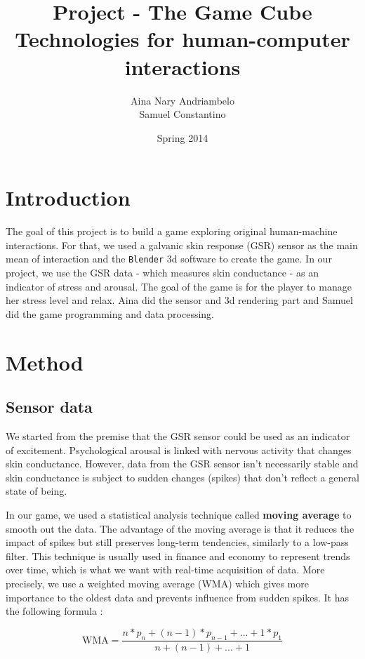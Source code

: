 \documentclass[12pt,a4paper]{article}
\title{\LARGE \textbf{Project - The Game Cube}\\
	\bigskip
	\bigskip
	\large Technologies for human-computer interactions}
\author{Aina Nary Andriambelo \\ Samuel Constantino}
\date{Spring 2014}
\begin{document}
	\maketitle


\section{Introduction}

The goal of this project is to build a game exploring original human-machine interactions. For that, we used a galvanic skin response (GSR) sensor as the main mean of interaction and the \texttt{Blender} 3d software to create the game. In our project, we use the GSR data - which measures skin conductance - as an indicator of stress and arousal. The goal of the game is for the player to manage her stress level and relax. Aina did the sensor and 3d rendering part and Samuel did the game programming and data processing.

\section{Method}

\subsection{Sensor data}

We started from the premise that the GSR sensor could be used as an indicator of excitement. Psychological arousal is linked with nervous activity that changes skin conductance. However, data from the GSR sensor isn't necessarily stable and skin conductance is subject to sudden changes (spikes) that don't reflect a general state of being.

In our game, we used a statistical analysis technique called \textbf{moving average} to smooth out the data. The advantage of the moving average is that it reduces the impact of spikes but still preserves long-term tendencies, similarly to a low-pass filter. This technique is usually used in finance and economy to represent trends over time, which is what we want with real-time acquisition of data. More precisely, we use a weighted moving average (WMA) which gives more importance to the oldest data and prevents influence from sudden spikes. It has the following formula : 

\begin{equation}
\text{WMA} = \frac{n * p_n + (n - 1) * p_{n-1} + ... + 1 * p_{1}}{n + (n-1) + ... + 1}
\end{equation}
\end{document}
